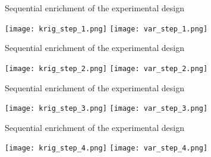 \documentclass[9pt]{beamer}
\begin{document}

\begin{frame}{Sequential enrichment of the experimental design}

\begin{center}
\texttt{[image: krig\_step\_1.png]}
\texttt{[image: var\_step\_1.png]}
\end{center}

\end{frame}



\begin{frame}{Sequential enrichment of the experimental design}

\begin{center}
\texttt{[image: krig\_step\_2.png]}
\texttt{[image: var\_step\_2.png]}
\end{center}


\end{frame}


\begin{frame}{Sequential enrichment of the experimental design}

\begin{center}
\texttt{[image: krig\_step\_3.png]}
\texttt{[image: var\_step\_3.png]}
\end{center}


\end{frame}


\begin{frame}{Sequential enrichment of the experimental design}

\begin{center}
\texttt{[image: krig\_step\_4.png]}
\texttt{[image: var\_step\_4.png]}
\end{center}


\end{frame}

\end{document}
